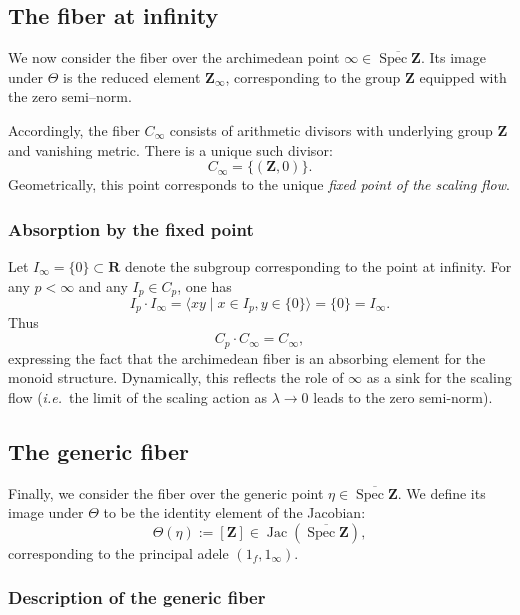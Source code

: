\documentclass[11pt,a4paper]{article}
\newcommand{\Z}{\mathbf{Z}}
\newcommand{\R}{\mathbf{R}}
\def\spzb{\overline{\Spec \Z}}
\newcommand{\Spec}{\operatorname{Spec}}
\def\Jac{\operatorname{Jac}}
\def\ie{{\it i.e.\/}\ }
\theoremstyle{plain}
\theoremstyle{definition} %
\begin{document}
\subsection{The fiber at infinity}

We now consider the fiber over the archimedean point $\infty \in \spzb$.
Its image under $\Theta$ is the reduced element $\Z_\infty$, corresponding to the
group $\Z$ equipped with the zero semi--norm.

Accordingly, the fiber $C_\infty$ consists of arithmetic divisors with underlying
group $\Z$ and vanishing metric.  There is a unique such divisor:
\[
C_\infty = \{ (\Z, 0) \}.
\]
Geometrically, this point corresponds to the unique \emph{fixed point of the scaling flow}.






\subsubsection{Absorption by the fixed point}

Let $I_\infty = \{0\} \subset \R$ denote the subgroup corresponding to the point
at infinity.  For any $p < \infty$ and any $I_p \in C_p$, one has
\[
I_p \cdot I_\infty = \langle xy \mid x \in I_p, y \in \{0\} \rangle = \{0\} = I_\infty.
\]
Thus
\[
C_p \cdot C_\infty = C_\infty ,
\]
expressing the fact that the archimedean fiber is an absorbing element for the
monoid structure.  Dynamically, this reflects the role of $\infty$ as a sink for
the scaling flow (\ie the limit of the scaling action as $\lambda \to 0$ leads to the zero semi-norm).





\subsection{The generic fiber}

Finally, we consider the fiber over the generic point $\eta \in \spzb$.
We define its image under $\Theta$ to be the identity element of the Jacobian:
\[
\Theta(\eta) := [\Z] \in \Jac(\spzb) ,
\]
corresponding to the principal adele $(1_f,1_\infty)$.




\subsubsection{Description of the generic fiber}
\end{document}
